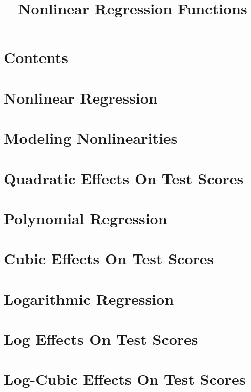 \title[Nonlinear Regression]{Nonlinear Regression Functions}
\date{}




\section{Contents}

\section{Nonlinear Regression}

\section{Modeling Nonlinearities}

\section{Quadratic Effects On Test Scores}

\section{Polynomial Regression}

\section{Cubic Effects On Test Scores}

\section{Logarithmic Regression}

\section{Log Effects On Test Scores}

\section{Log-Cubic Effects On Test Scores}

